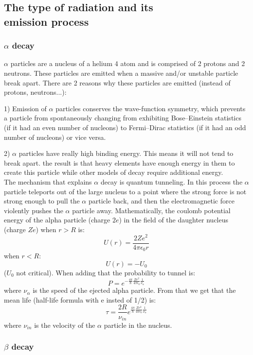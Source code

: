 \documentclass[]{article}
\begin{document}
\subsection{The type of radiation and its \\ emission process}
\subsubsection{$\alpha$ decay}

$\alpha$ particles are a nucleus of a helium 4 atom and is comprised of 2 protons and 2 neutrons. These particles are emitted when a massive and/or unstable particle break apart. 
There are 2 reasons why these particles are emitted (instead of protons, neutrons...):

1) Emission of $\alpha$ particles conserves the wave-function symmetry, which prevents a particle from spontaneously changing from exhibiting Bose–Einstein statistics (if it had an even number of nucleons) to Fermi–Dirac statistics (if it had an odd number of nucleons) or vice versa.

2) $\alpha$ particles have really high binding energy. This means it will not tend to break apart. the result is that heavy elements have enough energy in them to create this particle while other models of decay require additional energy. \\
The mechanism that explains $\alpha$ decay is quantum tunneling. In this process the $\alpha$ particle teleports out of the large nucleus to a point where the strong force is not strong enough to pull the $\alpha$ particle back, and then the electromagnetic force violently pushes the $\alpha$ particle away.
Mathematically, the coulomb potential energy of the alpha particle (charge $2e$) in the field of the daughter nucleus (charge $Ze$) when $r>R$ is: $$U(r)=\frac{2Ze^2}{4\pi \epsilon_0r}$$ when $r<R$: $$U(r)=-U_0$$ ($U_0$ not critical). When adding that the probability to tunnel is: $$P=e^{-\frac{4\pi}{\hbar}\frac{Ze^2}{4\pi \epsilon_0}\frac{1}{\nu_\alpha}}$$ where $\nu_\alpha$ is the speed of the ejected alpha particle. From that we get that the mean life (half-life formula with e insted of 1/2) is: $$\tau=\frac{2R}{\nu_{in}}e^{\frac{4\pi}{\hbar}\frac{Ze^2}{4\pi \epsilon_0}\frac{1}{\nu_\alpha}}$$ where $\nu_{in}$ is the velocity of the $\alpha$ particle in the nucleus.

\subsubsection{$\beta$ decay}
\end{document}
